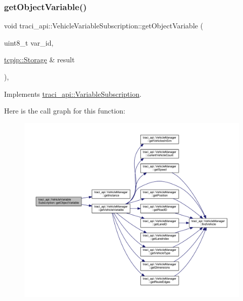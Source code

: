 \subsubsection{\texorpdfstring{get\+Object\+Variable()}{getObjectVariable()}}
{\footnotesize\ttfamily void traci\+\_\+api\+::\+Vehicle\+Variable\+Subscription\+::get\+Object\+Variable (\begin{DoxyParamCaption}\item[{uint8\+\_\+t}]{var\+\_\+id,  }\item[{\hyperlink{classtcpip_1_1_storage}{tcpip\+::\+Storage} \&}]{result }\end{DoxyParamCaption})\hspace{0.3cm}{\ttfamily [override]}, {\ttfamily [virtual]}}



Implements \hyperlink{classtraci__api_1_1_variable_subscription_a884dba03a44455e86c417c3641ec6aa4}{traci\+\_\+api\+::\+Variable\+Subscription}.

Here is the call graph for this function\+:
\nopagebreak
\begin{figure}[H]
\begin{center}
\leavevmode
\includegraphics[width=350pt]{classtraci__api_1_1_vehicle_variable_subscription_afaefff100368a747aefb8be29e8a7a91_cgraph}
\end{center}
\end{figure}
\mbox{\label{classtraci__api_1_1_vehicle_variable_subscription_a77ac472ae8dc1f284c2ec3f64b88cd0d}} 
